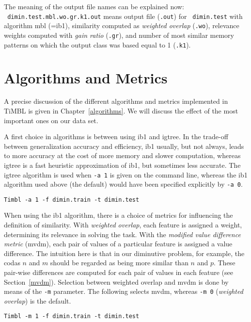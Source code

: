 \documentclass{report}
\begin{document}
The meaning of the output file names can be explained now:\\ {\tt
dimin.test.mbl.wo.gr.k1.out} means output file ({\tt .out}) for {\tt
dimin.test} with algorithm {\sc mbl} (={\sc ib1}), similarity computed as {\em
weighted overlap} ({\tt .wo}), relevance weights computed with {\em
gain ratio} ({\tt .gr}), and number of most similar memory patterns on
which the output class was based equal to 1 ({\tt .k1}).

\section{Algorithms and Metrics}

A precise discussion of the different algorithms and metrics
implemented in TiMBL is given in Chapter~\ref{algorithms}. We will
discuss the effect of the most important ones on our data set.

A first choice in algorithms is between using {\sc ib1} and {\sc
igtree}. In the trade-off between generalization accuracy and
efficiency, {\sc ib1} usually, but not always, leads to more accuracy
at the cost of more memory and slower computation, whereas {\sc
igtree} is a fast heuristic approximation of {\sc ib1}, but sometimes
less accurate. The {\sc igtree} algorithm is used when {\tt -a 1} is
given on the command line, whereas the {\sc ib1} algorithm used above
(the default) would have been specified explicitly by {\tt -a 0}.

{\small
\begin{verbatim}
Timbl -a 1 -f dimin.train -t dimin.test
\end{verbatim}
}

When using the {\sc ib1} algorithm, there is a choice of metrics for
influencing the definition of similarity. With {\em weighted overlap},
each feature is assigned a weight, determining its relevance in
solving the task. With the {\em modified value difference metric}
({\sc mvdm}), each pair of values of a particular feature is assigned
a value difference. The intuition here is that in our diminutive
problem, for example, the codas $n$ and $m$ should be regarded as
being more similar than $n$ and $p$. These pair-wise differences are
computed for each pair of values in each feature (see
Section~\ref{mvdm}). Selection between weighted overlap and {\sc mvdm}
is done by means of the {\tt -m} parameter. The following selects {\sc
mvdm}, whereas {\tt -m 0} ({\em weighted overlap}) is the default.

{\small
\begin{verbatim}
Timbl -m 1 -f dimin.train -t dimin.test
\end{verbatim}
}
\end{document}
